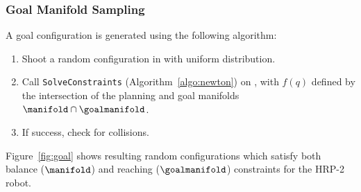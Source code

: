 \subsubsection{Goal Manifold Sampling}
\label{subsubsec:chap2-goal-sampling}

A goal configuration is generated using the following algorithm:
\begin{enumerate}
\item Shoot a random configuration  in {\cspace} with
  uniform distribution.
\item Call \texttt{SolveConstraints} (Algorithm~\ref{algo:newton}) on
  , with $f(q)$ defined by the intersection of the planning
  and goal manifolds $\manifold \cap \goalmanifold$.
\item If success, check for collisions.
\end{enumerate}

Figure~\ref{fig:goal} shows resulting random configurations which
satisfy both balance ($\manifold$) and reaching ($\goalmanifold$)
constraints for the HRP-2 robot.

